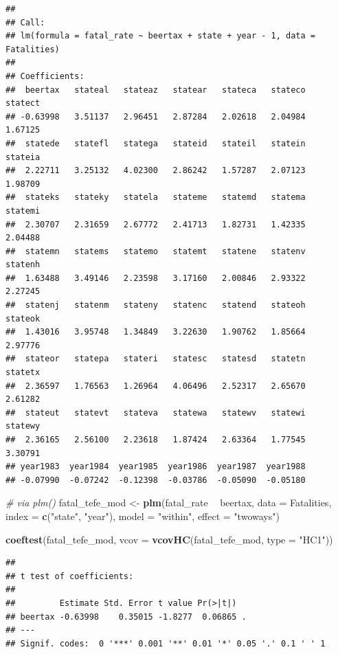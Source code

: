 \documentclass[]{book}
\newenvironment{Shaded}{\begin{snugshade}}{\end{snugshade}}
\newcommand{\KeywordTok}[1]{\textcolor[rgb]{0.13,0.29,0.53}{\textbf{#1}}}
\newcommand{\DataTypeTok}[1]{\textcolor[rgb]{0.13,0.29,0.53}{#1}}
\newcommand{\StringTok}[1]{\textcolor[rgb]{0.31,0.60,0.02}{#1}}
\newcommand{\CommentTok}[1]{\textcolor[rgb]{0.56,0.35,0.01}{\textit{#1}}}
\newcommand{\OperatorTok}[1]{\textcolor[rgb]{0.81,0.36,0.00}{\textbf{#1}}}
\newcommand{\NormalTok}[1]{#1}
\theoremstyle{definition}
\theoremstyle{definition}
\theoremstyle{definition}
\theoremstyle{remark}
\begin{document}
\begin{verbatim}
## 
## Call:
## lm(formula = fatal_rate ~ beertax + state + year - 1, data = Fatalities)
## 
## Coefficients:
##  beertax   stateal   stateaz   statear   stateca   stateco   statect  
## -0.63998   3.51137   2.96451   2.87284   2.02618   2.04984   1.67125  
##  statede   statefl   statega   stateid   stateil   statein   stateia  
##  2.22711   3.25132   4.02300   2.86242   1.57287   2.07123   1.98709  
##  stateks   stateky   statela   stateme   statemd   statema   statemi  
##  2.30707   2.31659   2.67772   2.41713   1.82731   1.42335   2.04488  
##  statemn   statems   statemo   statemt   statene   statenv   statenh  
##  1.63488   3.49146   2.23598   3.17160   2.00846   2.93322   2.27245  
##  statenj   statenm   stateny   statenc   statend   stateoh   stateok  
##  1.43016   3.95748   1.34849   3.22630   1.90762   1.85664   2.97776  
##  stateor   statepa   stateri   statesc   statesd   statetn   statetx  
##  2.36597   1.76563   1.26964   4.06496   2.52317   2.65670   2.61282  
##  stateut   statevt   stateva   statewa   statewv   statewi   statewy  
##  2.36165   2.56100   2.23618   1.87424   2.63364   1.77545   3.30791  
## year1983  year1984  year1985  year1986  year1987  year1988  
## -0.07990  -0.07242  -0.12398  -0.03786  -0.05090  -0.05180
\end{verbatim}

\begin{Shaded}
\begin{Highlighting}[]
\CommentTok{# via plm()}
\NormalTok{fatal_tefe_mod <-}\StringTok{ }\KeywordTok{plm}\NormalTok{(fatal_rate }\OperatorTok{~}\StringTok{ }\NormalTok{beertax, }
                      \DataTypeTok{data =}\NormalTok{ Fatalities,}
                      \DataTypeTok{index =} \KeywordTok{c}\NormalTok{(}\StringTok{"state"}\NormalTok{, }\StringTok{"year"}\NormalTok{), }
                      \DataTypeTok{model =} \StringTok{"within"}\NormalTok{, }
                      \DataTypeTok{effect =} \StringTok{"twoways"}\NormalTok{)}

\KeywordTok{coeftest}\NormalTok{(fatal_tefe_mod, }\DataTypeTok{vcov =} \KeywordTok{vcovHC}\NormalTok{(fatal_tefe_mod, }\DataTypeTok{type =} \StringTok{"HC1"}\NormalTok{))}
\end{Highlighting}
\end{Shaded}

\begin{verbatim}
## 
## t test of coefficients:
## 
##         Estimate Std. Error t value Pr(>|t|)  
## beertax -0.63998    0.35015 -1.8277  0.06865 .
## ---
## Signif. codes:  0 '***' 0.001 '**' 0.01 '*' 0.05 '.' 0.1 ' ' 1
\end{verbatim}
\end{document}

